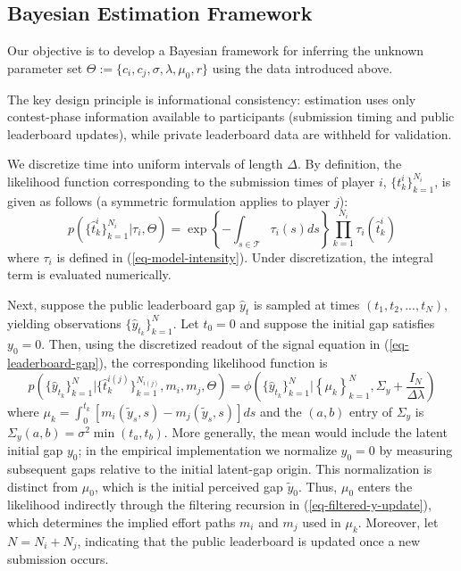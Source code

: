 \documentclass[mnsc]{informs3}
\begin{document}
\subsection{Bayesian Estimation Framework}

Our objective is to develop a Bayesian framework for inferring the unknown parameter set $\Theta := \{ c_i, c_j, \sigma, \lambda, \mu_0,r \}$ using the data introduced above.

The key design principle is informational consistency: estimation uses only contest-phase information available to participants (submission timing and public leaderboard updates), while private leaderboard data are withheld for validation.

We discretize time into uniform intervals of length $\Delta$.
By definition, the likelihood function corresponding to the submission times of player $i$, $\{t^i_k\}_{k=1}^{N_i}$, is given as follows (a symmetric formulation applies to player $j$):
\begin{equation}\label{eq-ihpp-prob}
p\left(\{\hat{t}^i_k\}_{k=1}^{N_i} | \tau_i, \Theta\right) = \exp\left\{-\int_{s\in\mathcal{T}}\tau_i(s)ds\right\}\prod_{k=1}^{N_i}\tau_i(\hat{t}^i_k)
\end{equation}
where $\tau_i$ is defined in (\ref{eq-model-intensity}).
Under discretization, the integral term is evaluated numerically.

Next, suppose the public leaderboard gap $\hat{y}_t$ is sampled at times $(t_1, t_2, ..., t_N)$, yielding observations $\{\hat{y}_{t_k}\}_{k=1}^N$.
Let $t_0 = 0$ and suppose the initial gap satisfies $y_0 = 0$.
Then, using the discretized readout of the signal equation in (\ref{eq-leaderboard-gap}), the corresponding likelihood function is
\begin{equation}\label{eq-obs_gap-prob}
p\left(\{\hat{y}_{t_k}\}_{k=1}^N | \{\hat{t}^{i(j)}_k\}_{k=1}^{N_{i(j)}}, m_i, m_j, \Theta\right) =
\phi\left(\{\hat{y}_{t_k}\}_{k=1}^N | \left\{\mu_k\right\}^N_{k=1}, \Sigma_y+\frac{I_N}{\Delta\lambda}\right)
\end{equation}
where $\mu_k = \int_{0}^{t_{k}}\left[m_i(\tilde{y}_s, s) - m_j(\tilde{y}_s, s)\right]ds$ and the $(a,b)$ entry of $\Sigma_y$ is $\Sigma_y(a,b)=\sigma^2\min(t_a,t_b)$.
More generally, the mean would include the latent initial gap $y_0$; in the empirical implementation we normalize $y_0=0$ by measuring subsequent gaps relative to the initial latent-gap origin.
This normalization is distinct from $\mu_0$, which is the initial perceived gap $\tilde y_0$.
Thus, $\mu_0$ enters the likelihood indirectly through the filtering recursion in (\ref{eq-filtered-y-update}), which determines the implied effort paths $m_i$ and $m_j$ used in $\mu_k$.
Moreover, let $N = N_i + N_j$, indicating that the public leaderboard is updated once a new submission occurs.
\end{document}
